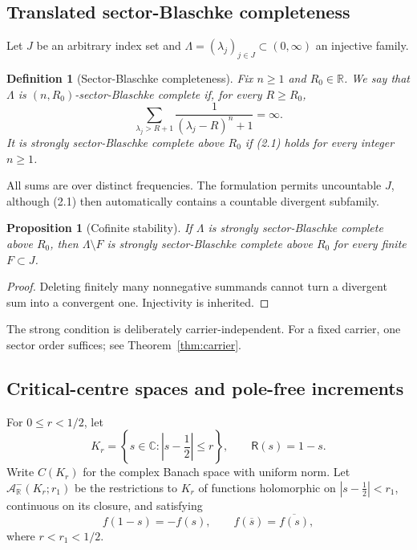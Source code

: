 \documentclass[11pt]{article}
\newtheorem{proposition}[theorem]{Proposition}
\newtheorem{definition}[theorem]{Definition}
\newcommand{\C}{\mathbb C}
\newcommand{\R}{\mathbb R}
\newcommand{\cA}{\mathcal A}
\newcommand{\FE}{\mathsf R}
\begin{document}
\subsection{Translated sector-Blaschke completeness}

Let \(J\) be an arbitrary index set and
\(\Lambda=(\lambda_j)_{j\in J}\subset(0,\infty)\) an injective family.

\begin{definition}[Sector-Blaschke completeness]\label{def:SB}
Fix \(n\geq1\) and \(R_0\in\R\).  We say that \(\Lambda\) is
\((n,R_0)\)-sector-Blaschke complete if, for every \(R\geq R_0\),
\[
 \sum_{\lambda_j>R+1}
 \frac{1}{(\lambda_j-R)^n+1}=\infty.
 \tag{2.1}
\]
It is \emph{strongly sector-Blaschke complete above \(R_0\)} if
\textup{(2.1)} holds for every integer \(n\geq1\).
\end{definition}

All sums are over distinct frequencies.  The formulation permits uncountable \(J\),
although (2.1) then automatically contains a countable divergent subfamily.

\begin{proposition}[Cofinite stability]\label{prop:cofinite}
If \(\Lambda\) is strongly sector-Blaschke complete above \(R_0\), then
\(\Lambda\setminus F\) is strongly sector-Blaschke complete above \(R_0\) for every
finite \(F\subset J\).
\end{proposition}

\begin{proof}
Deleting finitely many nonnegative summands cannot turn a divergent sum into a
convergent one.  Injectivity is inherited.
\end{proof}

The strong condition is deliberately carrier-independent.  For a fixed carrier, one
sector order suffices; see Theorem~\ref{thm:carrier}.

\subsection{Critical-centre spaces and pole-free increments}

For \(0\leq r<1/2\), let
\[
 K_r=\left\{s\in\C:\left|s-\frac12\right|\leq r\right\},
 \qquad \FE(s)=1-s.
 \tag{2.2}
\]
Write \(C(K_r)\) for the complex Banach space with uniform norm.  Let
\(\cA^-_{\R}(K_r;r_1)\) be the restrictions to \(K_r\) of functions holomorphic on
\(|s-\frac12|<r_1\), continuous on its closure, and satisfying
\[
 f(1-s)=-f(s),\qquad f(\overline{s})=\overline{f(s)},
 \tag{2.3}
\]
where \(r<r_1<1/2\).
\end{document}
